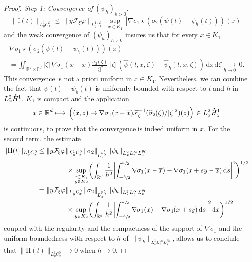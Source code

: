 \documentclass[JEP,XML,SOM,NoEqCountersInSection,NoFloatCountersInSection,Unicode,published]{cedram}
\let\bar\oldbar
\let\hat\oldhat
\theoremstyle{definition}
\newcommand*{\overbigdot}[1]{%
\accentset{\mbox{\large\bfseries .}}{#1}}
\let\bar\overline
\let\hat\widehat
\newcommand{\R}{\mathbb{R}}
\newcommand{\ud}{\, {\mathrm{d}}}
\begin{document}
\begin{proof}[Proof. Step 1: Convergence of $(\psi_{h})_{h>0}$]
\[
\|\mathrm{I}(t)\|_{L_{y}^{1}C_{x}^{0}}\leq\|y\mathcal{F}_{\xi}\varphi\|_{L_{y}^{1}C_{x}^{0}}\;\underset{x\in K_{1}}{\sup}\,\left|\nabla\sigma_{1}\star\left(\sigma_{2}(\psi(t)-\psi_{h}(t))\right)(x)\right|
\]
and the weak convergence of $(\psi_{h})_{h>0}$ insures us that for every $x\in K_1$
\begin{multline*}
\nabla\sigma_{1}\star\left(\sigma_{2}(\psi(t)-\psi_{h}(t))\right)(x)\\
=\iint_{\R^{d}\times\R^{d}}|\zeta|\,\nabla\sigma_{1}(x-\bar{x})\frac{\hat{\sigma}_{2}(\zeta)}{|\zeta|^{2}}\;|\zeta|\,\overline{\left(\hat{\psi}(t,\bar{x},\zeta)-\hat{\psi}_{h}(t,\bar{x},\zeta)\right)}
\ud \bar x \ud\zeta\underset{h\to 0}{\to}\,0.
\end{multline*}
This convergence is not a priori uniform in $x\in K_1$. Nevertheless, we can combine the fact that $\psi(t)-\psi_{h}(t)$ is uniformly bounded with respect to $t$ and $h$ in $L_{x}^{2}\overbigdot{H}_{z}^{1}$, $K_1$ is compact and the application
\[
x\in\mathbb R^d \longmapsto\,\left((\bar{x},z)\mapsto\nabla\sigma_{1}(x-\bar{x})\mathcal{F}_{\zeta}^{-1}(\hat{\sigma}_{2}(\zeta)/|\zeta|^{2})(z)\right)\,\in L_{x}^{2}\overbigdot{H}_{z}^{1}
\]
is continuous,
to prove that the convergence is indeed uniform in $x$. For the second term, the estimate\enlargethispage{-\baselineskip}
\begin{align*}
\|\mathrm{II}(t)\|_{L_{y}^{1}C_{x}^{0}}&\leq \|y\mathcal{F}_{\xi}\varphi\|_{L_{y}^{1}C_{x}^{0}}\,\|\sigma_{2}\|_{L_{z}^{p_{0}'}}\,\|\psi_{h}\|_{L_{x}^{2}L_{t}^{\infty}L_{z}^{p_{0}}}\\
&\hspace*{1.5cm}\times\underset{\substack{x\in K_{1} \\ y\in K_{2}}}{\sup}\biggl(\int_{\R^{d}}\frac{1}{h^{2}}\biggl|\int_{-\sfrac{h}{2}}^{\sfrac{h}{2}}\nabla\sigma_{1}(x-\bar{x})-\nabla\sigma_{1}(x+sy-\bar{x})\ud s\biggr|^{2}\biggr)^{1/2}\\
&=\|y\mathcal{F}_{\xi}\varphi\|_{L_{y}^{1}C_{x}^{0}}\,\|\sigma_{2}\|_{L_{z}^{p_{0}'}}\,\|\psi_{h}\|_{L_{x}^{2}L_{t}^{\infty}L_{z}^{p_{0}}}\\
&\hspace*{1.5cm}\times \underset{y\in K_{2}}{\sup}\biggl(\int_{\R^{d}}\frac{1}{h^{2}}\biggl|\int_{-\sfrac{h}{2}}^{\sfrac{h}{2}}\nabla\sigma_{1}(x)-\nabla\sigma_{1}(x+sy)\ud s\biggr|^{2}\ud x\biggr)^{1/2}
\end{align*}
coupled with the regularity and the compactness of the support of $\nabla\sigma_{1}$ and the uniform boundedness with respect to $h$ of $\|\psi_{h}\|_{L_{x}^{2}L_{t}^{\infty}L_{z}^{p_{0}}}$, allows us to conclude that $\|\mathrm{II}(t)\|_{L_{y}^{1}C_{x}^{0}}\to 0$ when $h\to 0$.


\end{proof}
\end{document}
